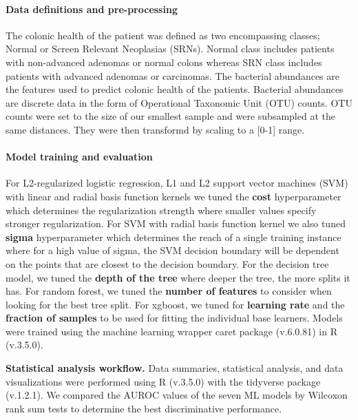 \documentclass[11pt,]{article}
\let\oldparagraph\paragraph
\renewcommand{\paragraph}[1]{\oldparagraph{#1}\mbox{}}
\begin{document}
\paragraph{Data definitions and
pre-processing}\label{data-definitions-and-pre-processing}

The colonic health of the patient was defined as two encompassing
classes; Normal or Screen Relevant Neoplasias (SRNs). Normal class
includes patients with non-advanced adenomas or normal colons whereas
SRN class includes patients with advanced adenomas or carcinomas. The
bacterial abundances are the features used to predict colonic health of
the patients. Bacterial abundances are discrete data in the form of
Operational Taxonomic Unit (OTU) counts. OTU counts were set to the size
of our smallest sample and were subsampled at the same distances. They
were then transformd by scaling to a {[}0-1{]} range.

\paragraph{Model training and
evaluation}\label{model-training-and-evaluation}

For L2-regularized logistic regression, L1 and L2 support vector
machines (SVM) with linear and radial basis function kernels we tuned
the \textbf{cost} hyperparameter which determines the regularization
strength where smaller values specify stronger regularization. For SVM
with radial basis function kernel we also tuned \textbf{sigma}
hyperparameter which determines the reach of a single training instance
where for a high value of sigma, the SVM decision boundary will be
dependent on the points that are closest to the decision boundary. For
the decision tree model, we tuned the \textbf{depth of the tree} where
deeper the tree, the more splits it has. For random forest, we tuned the
\textbf{number of features} to consider when looking for the best tree
split. For xgboost, we tuned for \textbf{learning rate} and the
\textbf{fraction of samples} to be used for fitting the individual base
learners. Models were trained using the machine learning wrapper caret
package (v.6.0.81) in R (v.3.5.0).

\textbf{Statistical analysis workflow.} Data summaries, statistical
analysis, and data visualizations were performed using R (v.3.5.0) with
the tidyverse package (v.1.2.1). We compared the AUROC values of the
seven ML models by Wilcoxon rank sum tests to determine the best
discriminative performance.
\end{document}
